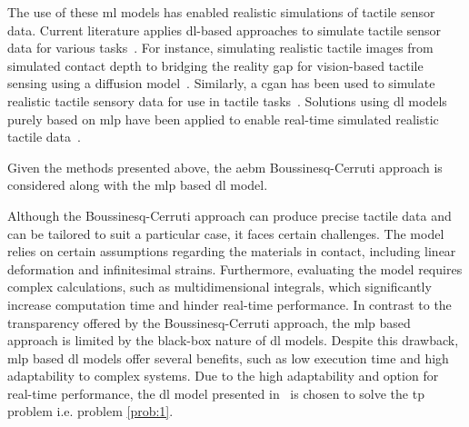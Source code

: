 The use of these \gls{ml} models has enabled realistic simulations of tactile sensor data. Current literature applies \gls{dl}-based approaches to simulate tactile sensor data for various tasks~\cite{more-than-a-feeling-learning-to-grasp-and-regrasp-using-vision-and-touch, single-grasp-object-classification-and-feature-extraction-with-simple-robot-hands-and-tactile-sensors}. For instance, simulating realistic tactile images from simulated contact depth to bridging
the reality gap for vision-based tactile sensing using a diffusion model~\cite{learning-to-read-braille:-bridging-the-tactile-reality-gap-with-diffusion-models}. Similarly, a \gls{cgan} has been used to simulate realistic tactile sensory data for use in tactile tasks~\cite{learning-to-read-braille:-bridging-the-tactile-reality-gap-with-diffusion-models}. Solutions using \gls{dl} models purely based on \gls{mlp} have been applied to enable real-time simulated realistic tactile data~\cite{simulation-of-the-syntouch-biotac-sensor}. \medskip

Given the methods presented above, the \gls{aebm} Boussinesq-Cerruti approach is considered along with the \gls{mlp} based \gls{dl} model. \medskip

Although the Boussinesq-Cerruti approach can produce precise tactile data and can be tailored to suit a particular case, it faces certain challenges. The model relies on certain assumptions regarding the materials in contact, including linear deformation and infinitesimal strains. Furthermore, evaluating the model requires complex calculations, such as multidimensional integrals, which significantly increase computation time and hinder real-time performance. In contrast to the transparency offered by the Boussinesq-Cerruti approach, the \gls{mlp} based approach is limited by the black-box nature of \gls{dl} models. Despite this drawback, \gls{mlp} based \gls{dl} models offer several benefits, such as low execution time and high adaptability to complex systems. Due to the high adaptability and option for real-time performance, the \gls{dl} model presented in~\cite{simulation-of-the-syntouch-biotac-sensor} is chosen to solve the \gls{tp} problem i.e. problem \ref{prob:1}.


